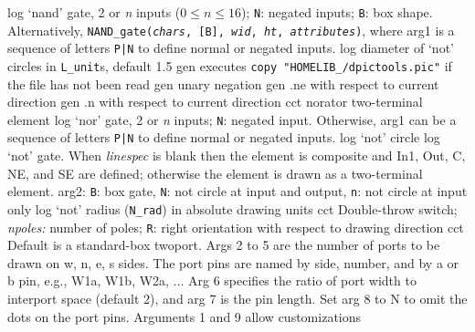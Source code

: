 %

%
  {log}%
  {`nand' gate, 2 or {\sl n\/} inputs ($0 \leq n \leq 16$);
   {\tt N}: negated inputs; {\tt B}: box shape.
   Alternatively, {\tt NAND\_gate({\sl chars}, [B], {\sl wid},
    {\sl ht}, {\sl attributes})}, where
   arg1 is a sequence of letters {\tt P|N} to define
   normal or negated inputs.
    }%
%
  {log}%
  {diameter of `not' circles in {\tt L\_unit}s, default 1.5}%
%
  {gen}%
  {executes {\tt copy "HOMELIB\_/dpictools.pic"} if the file has
  not been read}%
%
  {gen}%
  {unary negation}%
%
  {gen}%
  {.ne with respect to current direction}%
%
  {gen}%
  {.n with respect to current direction}%
%
  {cct}%
  { norator two-terminal element }%
%
  {log}%
  {`nor' gate, 2 or {\sl n\/} inputs; {\tt N}: negated input.
   Otherwise, arg1 can be a sequence of letters {\tt P|N} to define
   normal or negated inputs.
    }%
%
  {log}%
  {`not' circle}%
%
  {log}%
  {`not' gate.
   When {\sl linespec} is blank then the element is composite and In1,
   Out, C, NE, and SE are defined; otherwise the element is drawn as a
   two-terminal element. arg2: {\tt B}: box gate, {\tt N}: not circle at
   input and output, {\tt n}: not circle at input only
    }%
%
  {log}%
  {`not' radius ({\tt N\_rad}) in absolute drawing units}%
%
  {cct}%
  {Double-throw switch; {\sl npoles:} number of poles;
   {\tt R}: right orientation with respect to drawing direction
   }%
%
  {cct}%
  { Default is a standard-box twoport.  Args 2 to 5 are
    the number of ports to be drawn on w, n, e, s sides.  The port pins
    are named by side, number, and by a or b pin, e.g., W1a, W1b, W2a,
    $\ldots$ Arg 6 specifies the ratio of port width to interport space
    (default 2), and arg 7 is the pin length.  Set arg 8 to N to omit
    the dots on the port pins. Arguments 1 and 9 allow customizations
   }%
